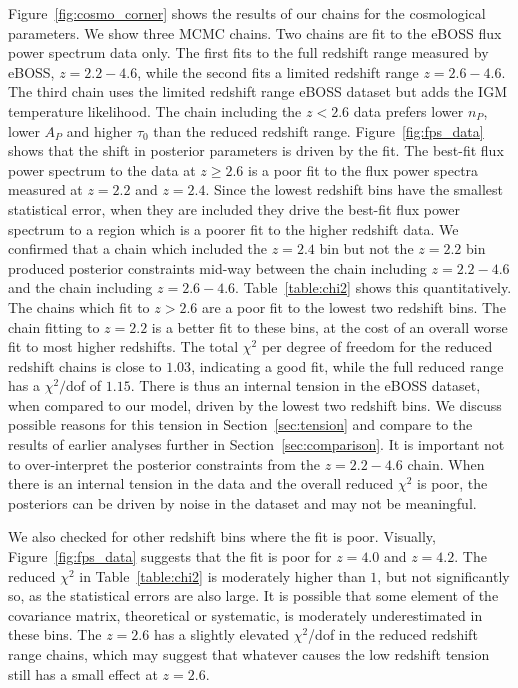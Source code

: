 Figure~\ref{fig:cosmo_corner} shows the results of our chains for the cosmological parameters.
We show three MCMC chains.
Two chains are fit to the eBOSS flux power spectrum data only.
The first fits to the full redshift range measured by eBOSS, $z=2.2 - 4.6$, while the second fits a limited redshift range $z=2.6 - 4.6$.
The third chain uses the limited redshift range eBOSS dataset but adds the IGM temperature likelihood.
The chain including the $z < 2.6$ data prefers lower $n_P$, lower $A_P$ and higher $\tau_0$ than the reduced redshift range.
Figure~\ref{fig:fps_data} shows that the shift in posterior parameters is driven by the fit.
The best-fit flux power spectrum to the data at $z \geq 2.6$ is a poor fit to the flux power spectra measured at $z=2.2$ and $z=2.4$.
Since the lowest redshift bins have the smallest statistical error, when they are included they drive the best-fit flux power spectrum to a region which is a poorer fit to the higher redshift data.
We confirmed that a chain which included the $z=2.4$ bin but not the $z=2.2$ bin produced posterior constraints mid-way between the chain including $z=2.2-4.6$ and the chain including $z=2.6-4.6$.
Table~\ref{table:chi2} shows this quantitatively.
The chains which fit to $z > 2.6$ are a poor fit to the lowest two redshift bins.
The chain fitting to $z=2.2$ is a better fit to these bins, at the cost of an overall worse fit to most higher redshifts.
The total $\chi^2$ per degree of freedom for the reduced redshift chains is close to $1.03$, indicating a good fit, while the full reduced range has a $\chi^2/$dof of $1.15$. 
There is thus an internal tension in the eBOSS dataset, when compared to our model, driven by the lowest two redshift bins.
We discuss possible reasons for this tension in Section~\ref{sec:tension} and compare to the results of earlier analyses further in Section~\ref{sec:comparison}.
It is important not to over-interpret the posterior constraints from the $z=2.2-4.6$ chain.
When there is an internal tension in the data and the overall reduced $\chi^2$ is poor, the posteriors can be driven by noise in the dataset and may not be meaningful.

We also checked for other redshift bins where the fit is poor.
Visually, Figure~\ref{fig:fps_data} suggests that the fit is poor for $z=4.0$ and $z=4.2$.
The reduced $\chi^2$ in Table~\ref{table:chi2} is moderately higher than $1$, but not significantly so, as the statistical errors are also large.
It is possible that some element of the covariance matrix, theoretical or systematic, is moderately underestimated in these bins.
The $z=2.6$ has a slightly elevated $\chi^2$/dof in the reduced redshift range chains, which may suggest that whatever causes the low redshift tension still has a small effect at $z=2.6$.  

